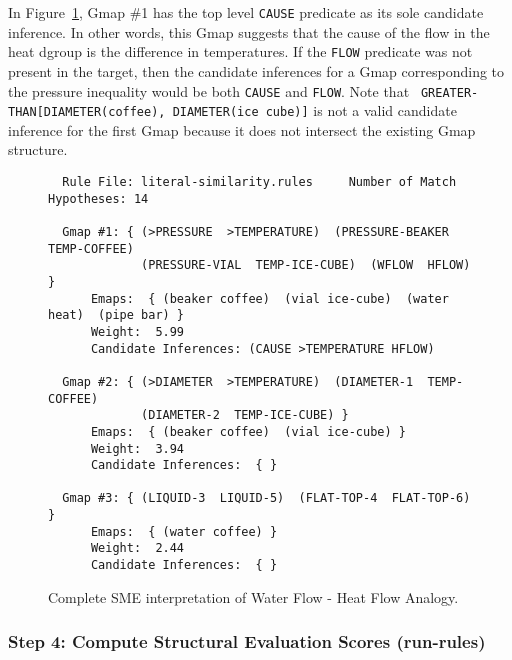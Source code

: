 In Figure~\ref{fg:wfhf-done}, Gmap \#1 has the top level {\tt CAUSE}
predicate as its sole candidate inference.  In other words, this Gmap
suggests that the cause of the flow in the heat dgroup is the difference in
temperatures.  If the {\tt FLOW} predicate was not present in the target,
then the candidate inferences for a Gmap corresponding to the pressure
inequality would be both {\tt CAUSE} and {\tt FLOW}. Note that {\tt
GREATER-THAN[DIAMETER(coffee), DIAMETER(ice cube)]} is not a valid candidate
inference for the first Gmap because it does not intersect the existing Gmap
structure.

\begin{figure}
\border
\begin{small}
\begin{verbatim}
  Rule File: literal-similarity.rules     Number of Match Hypotheses: 14

  Gmap #1: { (>PRESSURE  >TEMPERATURE)  (PRESSURE-BEAKER  TEMP-COFFEE)
             (PRESSURE-VIAL  TEMP-ICE-CUBE)  (WFLOW  HFLOW) }
      Emaps:  { (beaker coffee)  (vial ice-cube)  (water heat)  (pipe bar) }
      Weight:  5.99
      Candidate Inferences: (CAUSE >TEMPERATURE HFLOW)

  Gmap #2: { (>DIAMETER  >TEMPERATURE)  (DIAMETER-1  TEMP-COFFEE)
             (DIAMETER-2  TEMP-ICE-CUBE) }
      Emaps:  { (beaker coffee)  (vial ice-cube) }
      Weight:  3.94
      Candidate Inferences:  { }

  Gmap #3: { (LIQUID-3  LIQUID-5)  (FLAT-TOP-4  FLAT-TOP-6) }
      Emaps:  { (water coffee) }
      Weight:  2.44
      Candidate Inferences:  { }
\end{verbatim}
\end{small}

  \caption{Complete SME interpretation of Water Flow - Heat Flow Analogy.}
  \label{fg:wfhf-done}
\border
\end{figure}

\subsubsection{Step 4: Compute Structural Evaluation Scores (run-rules)}

